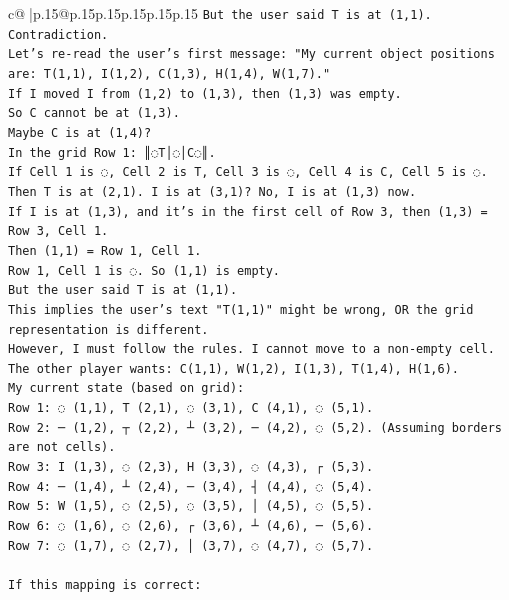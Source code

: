 \documentclass{article}
\begin{document}
{\begin{supertabular}{c@{$\;$}|p{.15\linewidth}@{}p{.15\linewidth}p{.15\linewidth}p{.15\linewidth}p{.15\linewidth}p{.15\linewidth}}
{{{\texttt{But the user said T is at (1,1).} \\
\texttt{Contradiction.} \\
\texttt{Let's re{-}read the user's first message: "My current object positions are: T(1,1), I(1,2), C(1,3), H(1,4), W(1,7)."} \\
\texttt{If I moved I from (1,2) to (1,3), then (1,3) was empty.} \\
\texttt{So C cannot be at (1,3).} \\
\texttt{Maybe C is at (1,4)?} \\
\texttt{In the grid Row 1: ║◌T│◌│C◌║.} \\
\texttt{If Cell 1 is ◌, Cell 2 is T, Cell 3 is ◌, Cell 4 is C, Cell 5 is ◌.} \\
\texttt{Then T is at (2,1). I is at (3,1)? No, I is at (1,3) now.} \\
\texttt{If I is at (1,3), and it's in the first cell of Row 3, then (1,3) = Row 3, Cell 1.} \\
\texttt{Then (1,1) = Row 1, Cell 1.} \\
\texttt{Row 1, Cell 1 is ◌. So (1,1) is empty.} \\
\texttt{But the user said T is at (1,1).} \\
\texttt{This implies the user's text "T(1,1)" might be wrong, OR the grid representation is different.} \\
\texttt{However, I must follow the rules. I cannot move to a non{-}empty cell.} \\
\texttt{The other player wants: C(1,1), W(1,2), I(1,3), T(1,4), H(1,6).} \\
\texttt{My current state (based on grid):} \\
\texttt{Row 1: ◌ (1,1), T (2,1), ◌ (3,1), C (4,1), ◌ (5,1).} \\
\texttt{Row 2: ─ (1,2), ┬ (2,2), ┴ (3,2), ─ (4,2), ◌ (5,2). (Assuming borders are not cells).} \\
\texttt{Row 3: I (1,3), ◌ (2,3), H (3,3), ◌ (4,3), ┌ (5,3).} \\
\texttt{Row 4: ─ (1,4), ┴ (2,4), ─ (3,4), ┤ (4,4), ◌ (5,4).} \\
\texttt{Row 5: W (1,5), ◌ (2,5), ◌ (3,5), │ (4,5), ◌ (5,5).} \\
\texttt{Row 6: ◌ (1,6), ◌ (2,6), ┌ (3,6), ┴ (4,6), ─ (5,6).} \\
\texttt{Row 7: ◌ (1,7), ◌ (2,7), │ (3,7), ◌ (4,7), ◌ (5,7).} \\
\\ 
\texttt{If this mapping is correct:} \\
}}}
\end{supertabular}}
\end{document}
